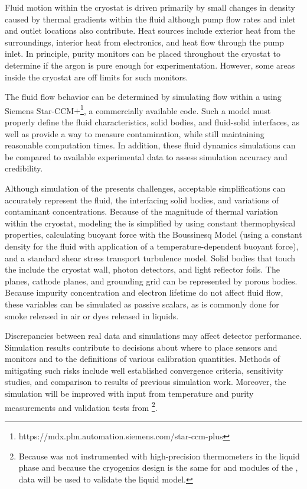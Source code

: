 Fluid motion within the cryostat is driven primarily by small changes in density caused by thermal gradients within the fluid although pump flow rates and inlet and outlet locations also contribute. Heat sources include exterior heat from the surroundings, interior heat from electronics, and heat flow through the pump inlet. In principle, purity monitors can be placed throughout the cryostat to determine if the argon is pure enough for experimentation. However, some areas inside the cryostat are off limits for such monitors. 


The fluid flow behavior can be determined by simulating  flow within a  %
using Siemens Star-CCM$+$\footnote{https://mdx.plm.automation.siemens.com/star-ccm-plus}, a commercially available  code.  Such a model must properly define the fluid characteristics, solid bodies, and fluid-solid interfaces, as well as provide a way to measure contamination, while still maintaining reasonable computation times. In addition, these fluid dynamics simulations can be compared to available experimental data to assess simulation accuracy and credibility. 

Although simulation of the  presents challenges, %
acceptable simplifications can %
accurately represent the fluid, the interfacing solid bodies, and variations of contaminant concentrations. Because of the magnitude of thermal variation within the cryostat, modeling the \lar is simplified by using constant thermophysical properties, calculating buoyant force with the Boussinesq Model (using a constant density for the fluid with application of a temperature-dependent buoyant force), and a standard shear stress transport turbulence model. Solid bodies that touch the \lar include the cryostat wall, photon detectors, and light reflector foils.  
The  planes, cathode planes, and grounding grid can be represented by porous bodies. Because impurity concentration and electron lifetime do not affect fluid flow, these variables can be simulated as passive scalars, as is commonly done for smoke released \cite{cfd-1} 
in air or dyes released in liquids.


Discrepancies between real data and simulations may affect detector performance. %
Simulation results contribute to decisions about where to place sensors and monitors and to %
the definitions of various calibration quantities. Methods of mitigating such risks include well established convergence criteria, sensitivity studies, and comparison to results of previous  simulation work. Moreover, the simulation will be improved with input from \lar temperature and purity measurements and validation tests from \footnote{Because  was not instrumented with high-precision thermometers in the liquid phase and because the cryogenics design is the same for  and  modules of the  ,  data will be used to validate the liquid  model.}. 

